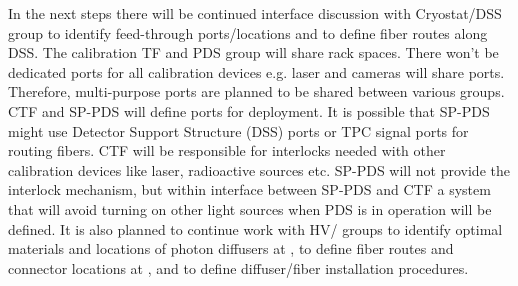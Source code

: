 

In the next steps there will be continued interface discussion with Cryostat/DSS group to identify feed-through ports/locations and to define fiber routes along DSS. The calibration TF and PDS group will share rack spaces. There won't be dedicated ports for all calibration devices e.g. laser and cameras will share ports. 
Therefore, multi-purpose ports are planned to be shared between various groups. CTF and SP-PDS will define ports for deployment. It is possible that SP-PDS might use Detector Support Structure (DSS) ports or TPC signal ports for routing fibers. CTF will be responsible for interlocks needed with other calibration devices 
like laser, radioactive sources etc. SP-PDS will not provide the interlock mechanism, but within interface between SP-PDS and CTF a system that will avoid turning  on other light sources when PDS is in operation will be defined.
It is also planned to continue work with HV/ groups to identify optimal materials and locations of photon diffusers at , to define fiber routes and connector locations  at , and to define diffuser/fiber installation procedures.

